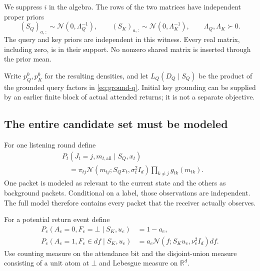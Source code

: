 \documentclass[11pt]{article}
\theoremstyle{definition}
\theoremstyle{remark}
\newcommand{\R}{\mathbb R}
\newcommand{\N}{\mathcal N}
\newcommand{\SQ}{S_{Q}}
\newcommand{\SK}{S_{K}}
\begin{document}
We suppress \(i\) in the algebra. The rows of the two matrices have independent proper priors
\begin{equation}
(\SQ)_{a,:}\sim\N(0,\Lambda_Q^{-1}),\qquad
(\SK)_{a,:}\sim\N(0,\Lambda_K^{-1}),\qquad
\Lambda_Q,\Lambda_K\succ0.
\label{eq:priors}
\end{equation}
The query and key priors are independent in this witness. Every real matrix, including zero, is in their support. No nonzero shared matrix is inserted through the prior mean.

Write \(p_Q^0,p_K^0\) for the resulting densities, and let \(L_Q(D_Q\mid\SQ)\) be the product of the grounded query factors in \eqref{eq:ground-q}. Initial key grounding can be supplied by an earlier finite block of actual attended returns; it is not a separate objective.

\subsection{The entire candidate set must be modeled}

For one listening round define
\begin{equation}
\begin{split}
&P_t(J_t=j,m_{t,\mathrm{all}}\mid \SQ,x_t)\\
&\quad =
\pi_{tj}
\N(m_{tj};\SQ x_t,\sigma_t^2I_d)
\prod_{k\ne j}g_{tk}(m_{tk}).
\end{split}
\label{eq:packet-joint}
\end{equation}
One packet is modeled as relevant to the current state and the others as background packets. Conditional on a label, those observations are independent. The full model therefore contains every packet that the receiver actually observes.

For a potential return event define
\begin{align}
P_e(A_e=0,F_e=\bot\mid\SK,u_e)&=1-a_e,\nonumber\\
P_e(A_e=1,F_e\in df\mid\SK,u_e)
&=a_e\N(f;\SK u_e,\nu_e^2I_d)df.
\label{eq:feedback-joint}
\end{align}
Use counting measure on the attendance bit and the disjoint-union measure consisting of a unit atom at \(\bot\) and Lebesgue measure on \(\R^d\).
\end{document}
